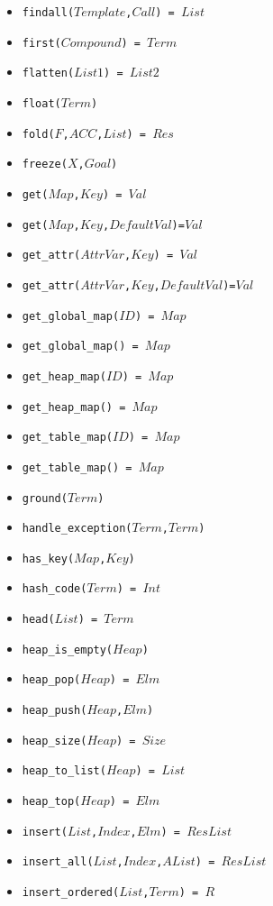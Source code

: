 \documentclass[10pt]{article}
\begin{document}
\begin{multicols}{2}
\begin{scriptsize}
\begin{itemize}
    \item \texttt{findall($Template$,$Call$) = $List$}
    \item \texttt{first($Compound$) = $Term$} 
    \item \texttt{flatten($List1$) = $List2$} 
    \item \texttt{float($Term$)} 
    \item \texttt{fold($F$,$ACC$,$List$) = $Res$} 
    \item \texttt{freeze($X$,$Goal$)}
    \item \texttt{get($Map$,$Key$) = $Val$}
    \item \texttt{get($Map$,$Key$,$DefaultVal$)=$Val$} 
    \item \texttt{get\_attr($AttrVar$,$Key$) = $Val$}
    \item \texttt{get\_attr($AttrVar$,$Key$,$DefaultVal$)=$Val$} 
    \item \texttt{get\_global\_map($ID$) = $Map$}
    \item \texttt{get\_global\_map() = $Map$}
    \item \texttt{get\_heap\_map($ID$) = $Map$} 
    \item \texttt{get\_heap\_map() = $Map$} 
    \item \texttt{get\_table\_map($ID$) = $Map$} 
    \item \texttt{get\_table\_map() = $Map$} 
    \item \texttt{ground($Term$)} 
    \item \texttt{handle\_exception($Term$,$Term$)} 
    \item \texttt{has\_key($Map$,$Key$)} 
    \item \texttt{hash\_code($Term$) = $Int$} 
    \item \texttt{head($List$) = $Term$} 
    \item \texttt{heap\_is\_empty($Heap$)}
    \item \texttt{heap\_pop($Heap$) = $Elm$}
    \item \texttt{heap\_push($Heap$,$Elm$)}
    \item \texttt{heap\_size($Heap$) = $Size$}
    \item \texttt{heap\_to\_list($Heap$) = $List$}
    \item \texttt{heap\_top($Heap$) = $Elm$}
    \item \texttt{insert($List$,$Index$,$Elm$) = $ResList$} 
    \item \texttt{insert\_all($List$,$Index$,$AList$) = $ResList$} 
    \item \texttt{insert\_ordered($List$,$Term$) = $R$} 

\end{itemize}
\end{scriptsize}
\end{multicols}
\end{document}
